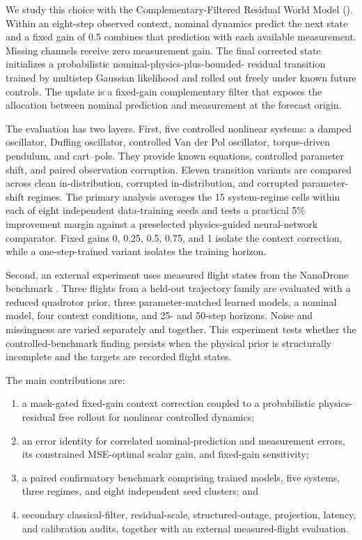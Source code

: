 We study this choice with the Complementary-Filtered Residual World Model
(\method). Within an eight-step observed context, nominal dynamics predict the
next state and a fixed gain of 0.5 combines that prediction with each available
measurement. Missing channels receive zero measurement gain. The final
corrected state initializes a probabilistic nominal-physics-plus-bounded-
residual transition trained by multistep Gaussian likelihood and rolled out
freely under known future controls. The update is a fixed-gain complementary
filter that exposes the allocation between nominal prediction and measurement
at the forecast origin.

The evaluation has two layers. First, five controlled nonlinear systems: a
damped oscillator, Duffing oscillator, controlled Van der Pol oscillator,
torque-driven pendulum, and cart--pole. They provide known equations, controlled
parameter shift, and paired observation corruption. Eleven transition variants
are compared across clean in-distribution, corrupted in-distribution, and
corrupted parameter-shift regimes. The primary analysis averages the 15
system-regime cells within each of eight independent data-training seeds and
tests a practical 5\% improvement margin against a preselected physics-guided
neural-network comparator. Fixed gains 0, 0.25, 0.5, 0.75, and 1 isolate the
context correction, while a one-step-trained variant isolates the training
horizon.

Second, an external experiment uses measured flight states from the NanoDrone
benchmark \cite{busetto2026_nanodrone}. Three flights from a held-out
trajectory family are evaluated with a reduced quadrotor prior, three
parameter-matched learned models, a nominal model, four context conditions, and
25- and 50-step horizons. Noise and missingness are varied separately and
together. This experiment tests whether the controlled-benchmark finding
persists when the physical prior is structurally incomplete and the targets are
recorded flight states.

The main contributions are:
\begin{enumerate}
 \item a mask-gated fixed-gain context correction coupled to a probabilistic
 physics-residual free rollout for nonlinear controlled dynamics;
 \item an error identity for correlated nominal-prediction and measurement
 errors, its constrained MSE-optimal scalar gain, and fixed-gain sensitivity;
 \item a paired confirmatory benchmark comprising \ConfirmatoryRuns{} trained
 models, five systems, three regimes, and eight independent seed clusters; and
 \item secondary classical-filter, residual-scale, structured-outage,
 projection, latency, and calibration audits, together with an external
 measured-flight evaluation.
\end{enumerate}

